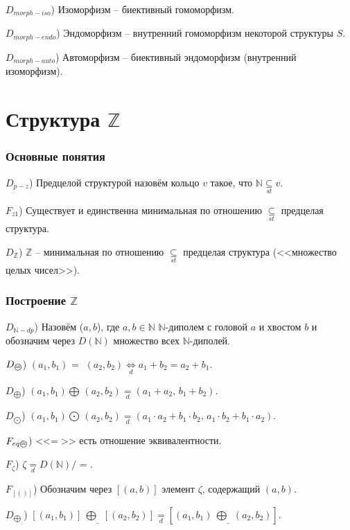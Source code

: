 \documentclass[a4paper]{article}
\newcommand{\Def}[0]{\underset{d}{\Leftrightarrow}}
\begin{document}
$D_{morph-iso}$) Изоморфизм -- биективный гомоморфизм.

$D_{morph-endo}$) Эндоморфизм -- внутренний гомоморфизм некоторой структуры $S$.

$D_{morph-auto}$) Автоморфизм -- биективный эндоморфизм (внутренний изоморфизм).

\clearpage


\part{Структура $\mathbb{Z}$}

\section{Основные понятия}

$D_{p-z}$) Предцелой структурой назовём кольцо $v$ такое, что $\mathbb{N} \underset{st}{\subseteq} v$.

$F_{z1}$) Существует и единственна минимальная по отношению $\underset{st}{\subseteq}$ предцелая структура.

$D_{\mathbb{Z}}$) $\mathbb{Z}$ -- минимальная по отношению $\underset{st}{\subseteq}$ предцелая структура (<<множество целых чисел>>).

\section{Построение $\mathbb{Z}$}

$D_{\mathbb{N}-dp}$) Назовём ($a,b$), где $a, b \in \mathbb{N}$  $\mathbb{N}$-диполем с головой $a$ и хвостом $b$ и обозначим через $D(\mathbb{N})$ множество всех $\mathbb{N}$-диполей.

$D_{\text{\textcircled{=}}}$) $(a_1, b_1)$ \textcircled{=} $(a_2, b_2) \Def a_1 + b_2 = a_2 + b_1.$

$D_{\bigoplus}$) $(a_1, b_1) \bigoplus \, (a_2, b_2) \underset{d}{=} (a_1 + a_2, \, b_1 + b_2).$

$D_{\bigodot}$) $(a_1, b_1) \bigodot \, (a_2, b_2) \underset{d}{=} (a_1 \cdot a_2 + b_1 \cdot b_2, \, a_1 \cdot b_2 + b_1 \cdot a_2).$

$F_{eq \text{\textcircled{=}}}$) <<\textcircled{=}>> есть отношение эквивалентности.

$F_{\zeta}$) $\zeta \underset{d}{=} D(\mathbb{N}) /$ \textcircled{=}.

$F_{[()]}$) Обозначим через $[(a, b)]$ элемент $\zeta$, содержащий $(a, b)$.

$D_{\underline{\bigoplus}}$)  $[(a_1, b_1)] \: \underline{\bigoplus} \: [(a_2, b_2)] \underset{d}{=} [(a_1, b_1) \: \underline{\bigoplus} \: (a_2, b_2)].$
\end{document}
